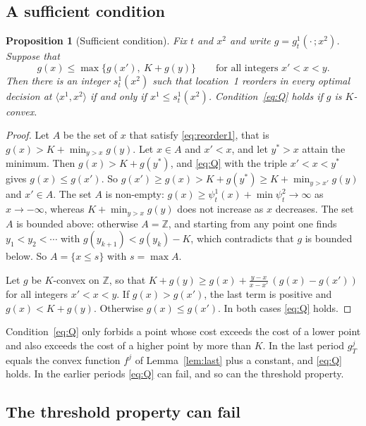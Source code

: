 \documentclass[11pt]{article}
\newcommand{\Z}{\mathbb{Z}}
\newtheorem{proposition}{Proposition}
\theoremstyle{definition}
\begin{document}
\subsection{A sufficient condition}

\begin{proposition}[Sufficient condition]\label{prop:Q}
Fix $t$ and $x^2$ and write $g=g^1_t(\cdot\,;x^2)$. Suppose that
\begin{equation}\label{eq:Q}\tag{Q}
g(x)\le\max\{g(x'),\ K+g(y)\}\qquad\text{for all integers }x'<x<y .
\end{equation}
Then there is an integer $s^1_t(x^2)$ such that location~1 reorders in every optimal decision at $\langle x^1,x^2\rangle$ if and only if $x^1\le s^1_t(x^2)$. Condition~\eqref{eq:Q} holds if $g$ is $K$-convex.
\end{proposition}

\begin{proof}
Let $A$ be the set of $x$ that satisfy \eqref{eq:reorder1}, that is $g(x)>K+\min_{y>x}g(y)$. Let $x\in A$ and $x'<x$, and let $y^*>x$ attain the minimum. Then $g(x)>K+g(y^*)$, and \eqref{eq:Q} with the triple $x'<x<y^*$ gives $g(x)\le g(x')$. So $g(x')\ge g(x)>K+g(y^*)\ge K+\min_{y>x'}g(y)$ and $x'\in A$. The set $A$ is non-empty: $g(x)\ge\psi^1_t(x)+\min\psi^2_t\to\infty$ as $x\to-\infty$, whereas $K+\min_{y>x}g(y)$ does not increase as $x$ decreases. The set $A$ is bounded above: otherwise $A=\Z$, and starting from any point one finds $y_1<y_2<\cdots$ with $g(y_{k+1})<g(y_k)-K$, which contradicts that $g$ is bounded below. So $A=\{x\le s\}$ with $s=\max A$.

Let $g$ be $K$-convex on $\Z$, so that $K+g(y)\ge g(x)+\frac{y-x}{x-x'}\,(g(x)-g(x'))$ for all integers $x'<x<y$. If $g(x)>g(x')$, the last term is positive and $g(x)<K+g(y)$. Otherwise $g(x)\le g(x')$. In both cases \eqref{eq:Q} holds.
\end{proof}

Condition~\eqref{eq:Q} only forbids a point whose cost exceeds the cost of a lower point and also exceeds the cost of a higher point by more than $K$. In the last period $g^j_T$ equals the convex function $f^j$ of Lemma~\ref{lem:last} plus a constant, and \eqref{eq:Q} holds. In the earlier periods \eqref{eq:Q} can fail, and so can the threshold property.

\subsection{The threshold property can fail}
\end{document}
